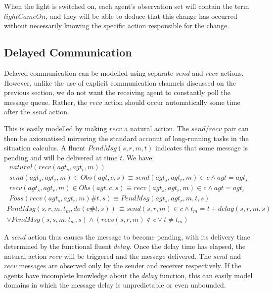 When the light is switched on, each agent's observation set will contain
the term $lightCameOn$, and they will be able to deduce that this
change has occurred without necessarily knowing the specific action
responsible for the change.


\subsection{Delayed Communication}

Delayed communication can be modelled using separate $send$ and $recv$
actions. However, unlike the use of explicit communication channels
discussed on the previous section, we do not want the receiving agent
to constantly poll the message queue. Rather, the $recv$ action should
occur automatically some time after the $send$ action.

This is easily modelled by making $recv$ a natural action. The $send/recv$
pair can then be axiomatised mirroring the standard account of long-running
tasks in the situation calculus. A fluent $PendMsg(s,r,m,t)$ indicates
that some message is pending and will be delivered at time $t$. We
have:\begin{gather*}
natural(recv(agt_{s},agt_{r},m))\\
send(agt_{s},agt_{r},m)\in Obs(agt,c,s)\equiv send(agt_{s},agt_{r},m)\in c\wedge agt=agt_{s}\\
recv(agt_{s},agt_{r},m)\in Obs(agt,c,s)\equiv recv(agt_{s},agt_{r},m)\in c\wedge agt=agt_{r}\\
Poss(recv(agt_{s},agt_{r},m)\#t,s)\equiv PendMsg(agt_{s},agt_{r},m,t,s)\end{gather*}
 \begin{multline*}
PendMsg(s,r,m,t_{m},do(c\#t,s))\,\equiv send(s,r,m)\in c\wedge t_{m}=t+delay(s,r,m,s)\\
\vee PendMsg(s,s,m,t_{m},s)\wedge\left(recv(s,r,m)\not\in c\vee t\neq t_{m}\right)\end{multline*}


A $send$ action thus causes the message to become pending, with its
delivery time determined by the functional fluent $delay$. Once the
delay time has elapsed, the natural action $recv$ will be triggered
and the message delivered. The $send$ and $recv$ messages are observed
only by the sender and receiver respectively. If the agents have incomplete
knowledge about the $delay$ function, this can easily model domains
in which the message delay is unpredictable or even unbounded.


